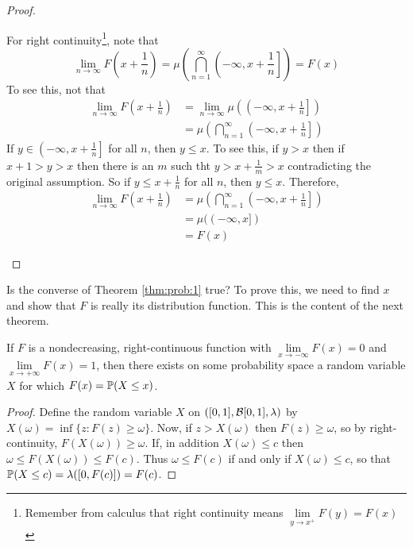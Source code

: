 \begin{proof}
\begin{prooflist}
\item For right continuity\footnote{Remember from calculus that right continuity means $\lim\limits_{y\to x^+}F(y)=F(x)$}, note that
\begin{equation*}
\lim\limits_{n\to\infty}F\left(x+\frac{1}{n}\right)=\mu\left(\bigcap_{n=1}^\infty\left(-\infty,x+\frac{1}{n}\right]\right)=F(x)
\end{equation*}
To see this, not that
\begin{align*}
\lim\limits_{n\to\infty}F\left(x+\frac{1}{n}\right)&=
	\lim\limits_{n\to\infty}\mu\left(\left(-\infty, x+\frac{1}{n}\right]\right)\\
	&=\mu\left(\bigcap_{n=1}^\infty\left(-\infty,x+\frac{1}{n}\right]\right)
\end{align*}
If $y\in\left(-\infty,x+\frac{1}{n}\right]$ for all $n$, then $y\leq x$. To see this, if $y>x$ then if $x+1>y>x$ then there is an $m$ such tht $y>x+\frac{1}{m}>x$ contradicting the original assumption. So if $y\leq x+\frac{1}{n}$ for all $n$, then $y\leq x$. Therefore,
\begin{align*}
\lim\limits_{n\to\infty}F\left(x+\frac{1}{n}\right)&=\mu\left(\bigcap_{n=1}^\infty\left(-\infty,x+\frac{1}{n}\right]\right)\\
	&=\mu((-\infty,x])\\
	&=F(x)
\end{align*}
\end{prooflist}
\end{proof}


Is the converse of Theorem \ref{thm:prob:1} true? To prove this, we need to find $x$ and show that $F$ is really its distribution function. This is the content of the next theorem.


\begin{theorem}
If $F$ is a nondecreasing, right-continuous function with $\lim\limits_{x\to-\infty}F(x)=0$ and $\lim\limits_{x\to+\infty}F(x)=1$, then there exists on some probability space a random variable $X$ for which $F(x)=\mathbb P(X\leq x)$.
\end{theorem}

\begin{proof}
Define the random variable $X$ on $([0,1], \mathcal B[0,1], \lambda)$ by $X(\omega)=\inf\{z:F(z)\geq \omega \}$. Now, if $z>X(\omega)$ then $F(z)\geq \omega$, so by right-continuity, $F(X(\omega))\geq \omega$. If, in addition $X(\omega)\leq c$ then $\omega\leq F(X(\omega))\leq F(c)$. Thus $\omega\leq F(c)$ if and only if $X(\omega)\leq c$, so that $\mathbb P(X\leq c)=\lambda([0,F(c)])=F(c)$.
\end{proof}



